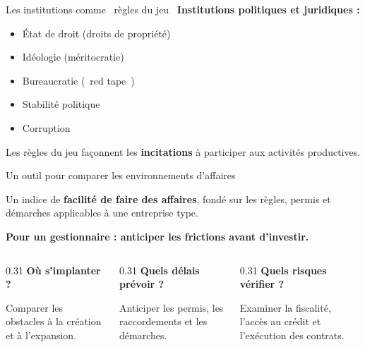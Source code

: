 \documentclass[aspectratio=169]{beamer}
\begin{document}
\begin{frame}[t]{Les institutions comme \guillemotleft~règles du jeu~\guillemotright}
   \small
   \textbf{Institutions politiques et juridiques :}
   \vspace{0.15cm}
   \begin{itemize}
      \setlength\itemsep{0.1cm}
      \item État de droit (droits de propriété)
      \item Idéologie (méritocratie)
      \item Bureaucratie (\guillemotleft~red tape~\guillemotright)
      \item Stabilité politique
      \item Corruption
   \end{itemize}
   \vspace{0.2cm}
   \begin{keyinsight}
      Les règles du jeu façonnent les \textbf{incitations} à participer aux activités productives.
   \end{keyinsight}
\end{frame}

\begin{frame}{Un outil pour comparer les environnements d'affaires}
   \begin{defbox}
      Un indice de \textbf{facilité de faire des affaires}, fondé sur les règles, permis et démarches applicables à une entreprise type.
   \end{defbox}
   \vspace{0.25cm}
   \textbf{Pour un gestionnaire : anticiper les frictions avant d'investir.}
   \vspace{0.3cm}
   \begin{columns}[T,onlytextwidth]
      \begin{column}{0.31\textwidth}
         {\color{HECgreen}\textbf{Où s'implanter ?}}\par\vspace{0.15cm}
         \small Comparer les obstacles à la création et à l'expansion.
      \end{column}
      \begin{column}{0.31\textwidth}
         {\color{HECgreen}\textbf{Quels délais prévoir ?}}\par\vspace{0.15cm}
         \small Anticiper les permis, les raccordements et les démarches.
      \end{column}
      \begin{column}{0.31\textwidth}
         {\color{HECgreen}\textbf{Quels risques vérifier ?}}\par\vspace{0.15cm}
         \small Examiner la fiscalité, l'accès au crédit et l'exécution des contrats.
      \end{column}
   \end{columns}
\end{frame}
\end{document}
